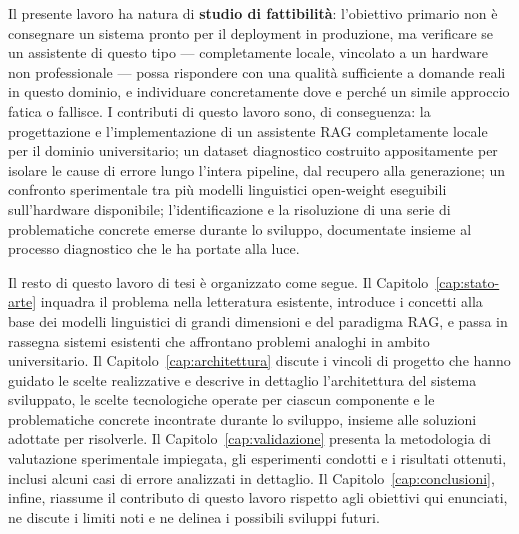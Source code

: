 Il presente lavoro ha natura di \textbf{studio di fattibilità}: l'obiettivo primario non è consegnare un sistema
pronto per il deployment in produzione, ma verificare se un assistente di questo tipo --- completamente locale,
vincolato a un hardware non professionale --- possa rispondere con una qualità sufficiente a domande reali in questo
dominio, e individuare concretamente dove e perché un simile approccio fatica o fallisce. I contributi di questo
lavoro sono, di conseguenza: la progettazione e l'implementazione di un assistente RAG completamente locale per il
dominio universitario; un dataset diagnostico costruito appositamente per isolare le cause di errore lungo l'intera
pipeline, dal recupero alla generazione; un confronto sperimentale tra più modelli linguistici open-weight eseguibili
sull'hardware disponibile; l'identificazione e la risoluzione di una serie di problematiche concrete emerse durante
lo sviluppo, documentate insieme al processo diagnostico che le ha portate alla luce.

Il resto di questo lavoro di tesi è organizzato come segue. Il Capitolo~\ref{cap:stato-arte} inquadra il problema
nella letteratura esistente, introduce i concetti alla base dei modelli linguistici di grandi dimensioni e del
paradigma RAG, e passa in rassegna sistemi esistenti che affrontano problemi analoghi in ambito universitario. Il
Capitolo~\ref{cap:architettura} discute i vincoli di progetto che hanno guidato le scelte realizzative e descrive in
dettaglio l'architettura del sistema sviluppato, le scelte tecnologiche operate per ciascun componente e le
problematiche concrete incontrate durante lo sviluppo, insieme alle soluzioni adottate per risolverle. Il
Capitolo~\ref{cap:validazione} presenta la metodologia di valutazione sperimentale impiegata, gli esperimenti
condotti e i risultati ottenuti, inclusi alcuni casi di errore analizzati in dettaglio. Il
Capitolo~\ref{cap:conclusioni}, infine, riassume il contributo di questo lavoro rispetto agli obiettivi qui
enunciati, ne discute i limiti noti e ne delinea i possibili sviluppi futuri.

